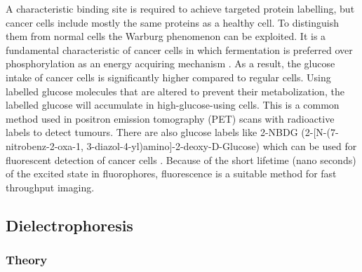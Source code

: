 \documentclass[final]{jyflluk}
\begin{document}
A characteristic binding site is required to achieve targeted protein labelling, but cancer cells include mostly the same proteins as a healthy cell. To distinguish them from normal cells the Warburg phenomenon can be exploited. It is a fundamental characteristic of cancer cells in which fermentation is preferred over phosphorylation as an energy acquiring mechanism \cite{warburg1927metabolism}. As a result, the glucose intake of cancer cells is significantly higher compared to regular cells. Using labelled glucose molecules that are altered to prevent their metabolization, the labelled glucose will accumulate in high-glucose-using cells. This is a common method used in positron emission tomography (PET) scans with radioactive labels to detect tumours. There are also glucose labels like 2-NBDG (2-[N-(7-nitrobenz-2-oxa-1, 3-diazol-4-yl)amino]-2-deoxy-D-Glucose) which can be used for fluorescent detection of cancer cells \cite{cai20132}. Because of the short lifetime (nano seconds) of the excited state in fluorophores, fluorescence is a suitable method for fast throughput imaging.


\newpage
\subsection{Dielectrophoresis}
\label{sec:x3}
\subsubsection{Theory}
\label{sex:x3.1}
\end{document}
